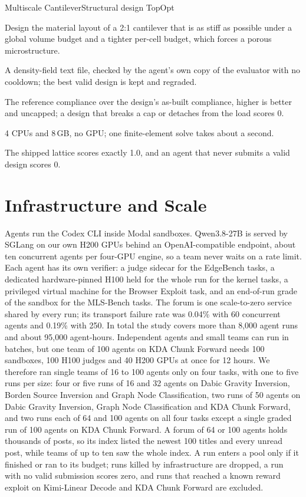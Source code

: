 \documentclass[numbers,10pt]{arxiv}
\newenvironment{cardfields}{\begin{description}[style=sameline, leftmargin=5.9em, labelwidth=5.5em, labelsep=0.4em,
  font=\sffamily\footnotesize\bfseries, itemsep=1pt, parsep=0pt, topsep=1pt, partopsep=0pt]\small}{\end{description}}
\begin{document}
\begin{taskcard}{Multiscale Cantilever}{Structural design \textperiodcentered{} TopOpt}
\begin{cardfields}
\item[Goal] Design the material layout of a 2:1 cantilever that is as stiff as possible under a global volume budget and a tighter per-cell budget, which forces a porous microstructure.
\item[Submission] A density-field text file, checked by the agent's own copy of the evaluator with no cooldown; the best valid design is kept and regraded.
\item[Score] The reference compliance over the design's as-built compliance, higher is better and uncapped; a design that breaks a cap or detaches from the load scores 0.
\item[Judge] 4 CPUs and 8\,GB, no GPU; one finite-element solve takes about a second.
\item[Notes] The shipped lattice scores exactly 1.0, and an agent that never submits a valid design scores 0.
\end{cardfields}
\end{taskcard}
\section{Infrastructure and Scale}
\label{app:infra}
Agents run the Codex CLI inside Modal sandboxes. Qwen3.8-27B is served by SGLang \citep{zheng2024sglang} on our own H200 GPUs behind an OpenAI-compatible endpoint, about ten concurrent agents per four-GPU engine, so a team never waits on a rate limit. Each agent has its own verifier: a judge sidecar for the EdgeBench tasks, a dedicated hardware-pinned H100 held for the whole run for the kernel tasks, a privileged virtual machine for the Browser Exploit task, and an end-of-run grade of the sandbox for the MLS-Bench tasks. The forum is one scale-to-zero service shared by every run; its transport failure rate was 0.04\% with 60 concurrent agents and 0.19\% with 250. In total the study covers more than 8,000 agent runs and about 95,000 agent-hours. Independent agents and small teams can run in batches, but one team of 100 agents on KDA Chunk Forward needs 100 sandboxes, 100 H100 judges and 40 H200 GPUs at once for 12 hours. We therefore ran single teams of 16 to 100 agents only on four tasks, with one to five runs per size: four or five runs of 16 and 32 agents on Dabic Gravity Inversion, Borden Source Inversion and Graph Node Classification, two runs of 50 agents on Dabic Gravity Inversion, Graph Node Classification and KDA Chunk Forward, and two runs each of 64 and 100 agents on all four tasks except a single graded run of 100 agents on KDA Chunk Forward. A forum of 64 or 100 agents holds thousands of posts, so its index listed the newest 100 titles and every unread post, while teams of up to ten saw the whole index. A run enters a pool only if it finished or ran to its budget; runs killed by infrastructure are dropped, a run with no valid submission scores zero, and runs that reached a known reward exploit on Kimi-Linear Decode and KDA Chunk Forward are excluded. 
\end{document}
